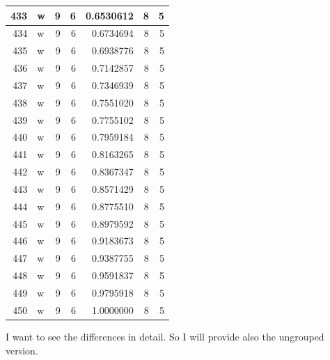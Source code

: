 \documentclass[
  letterpaper,
  DIV=11,
  numbers=noendperiod]{scrreprt}
\begin{document}
\begin{table}
\begin{tabular}[t]{r|l|r|r|r|r|r}
\hline
433 & w & 9 & 6 & 0.6530612 & 8 & 5\\
\hline
434 & w & 9 & 6 & 0.6734694 & 8 & 5\\
\hline
435 & w & 9 & 6 & 0.6938776 & 8 & 5\\
\hline
436 & w & 9 & 6 & 0.7142857 & 8 & 5\\
\hline
437 & w & 9 & 6 & 0.7346939 & 8 & 5\\
\hline
438 & w & 9 & 6 & 0.7551020 & 8 & 5\\
\hline
439 & w & 9 & 6 & 0.7755102 & 8 & 5\\
\hline
440 & w & 9 & 6 & 0.7959184 & 8 & 5\\
\hline
441 & w & 9 & 6 & 0.8163265 & 8 & 5\\
\hline
442 & w & 9 & 6 & 0.8367347 & 8 & 5\\
\hline
443 & w & 9 & 6 & 0.8571429 & 8 & 5\\
\hline
444 & w & 9 & 6 & 0.8775510 & 8 & 5\\
\hline
445 & w & 9 & 6 & 0.8979592 & 8 & 5\\
\hline
446 & w & 9 & 6 & 0.9183673 & 8 & 5\\
\hline
447 & w & 9 & 6 & 0.9387755 & 8 & 5\\
\hline
448 & w & 9 & 6 & 0.9591837 & 8 & 5\\
\hline
449 & w & 9 & 6 & 0.9795918 & 8 & 5\\
\hline
450 & w & 9 & 6 & 1.0000000 & 8 & 5\\
\hline
\end{tabular}
\end{table}

I want to see the differences in detail. So I will provide also the
ungrouped version.
\end{document}

